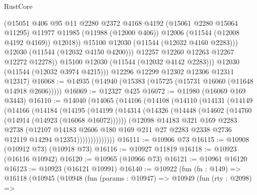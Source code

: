 \begin{lexlean}{RustCore}
\begin{coremodule}
                    (@15051
                      @406
                      @95
                      @11
                      @2280
                      @2372
                      @4168
                      @4192
                      (@15061 @2280 @15064 @11295)
                      @11977
                      @11985
                      (@11988 (@12000 @406))
                      @12006
                      (@11544 (@12008 @4192 @4169))
                      @12018))
                  @15100
                  @12030
                  (@11544 (@12032 @4160 @2283)))
                @12030
                (@11544 (@12032 @4150 @4200)))
              @12257
              @12260
              @12263
              @12267
              @12272
              @12278))
          @15100
          @12030
          (@11544 (@12032 @4142 @2283)))
        @12030
        (@11544 (@12032 @3974 @4215)))
      @12296
      @12299
      @12302
      @12306
      @12311
      @12317)
@16068 := @14935 (@14940 (@15383 (@15725 (@15731 @16060 (@11648 @14918 @2606)))))
@16069 := @12327 @425
@16072 := @11980 (@16069 @169 @3443)
@16110 := @14040
    (@14065
      (@14106
        (@14108
          (@14110
            (@14131
              (@14149
                (@14166
                  (@14184
                    (@14195
                      (@14199
                        (@14314
                          (@14326
                            (@14448 (@14602 (@14760 (@14914 (@14923 (@16068 @16072))))))
                            (@12098
                              @14183
                              @321
                              @169
                              @2283
                              @2738
                              (@12107
                                @14183
                                @2606
                                @180
                                @169
                                @211
                                @27
                                @2283
                                @2338
                                @2736
                                @12119
                                @14294
                                @12351))))))))))))))
@16111 := @10906 @73
@16115 := @10908 (@10912 @73) (@10918 @73)
@16116 := @10927 @11819
@16118 := @10923 (@16116 @10942)
@16120 := @10965 (@10966 @73)
@16121 := @10961 @16120
@16123 := @10923 (@16121 @10991)
@16140 := @10922
    (fun (fn : @149) =>
    @16118
      (@10945
        (@10948
          (fun (params : @10947) =>
          @10949
            (fun (rty : @2098) =>

\end{coremodule}
\end{lexlean}

